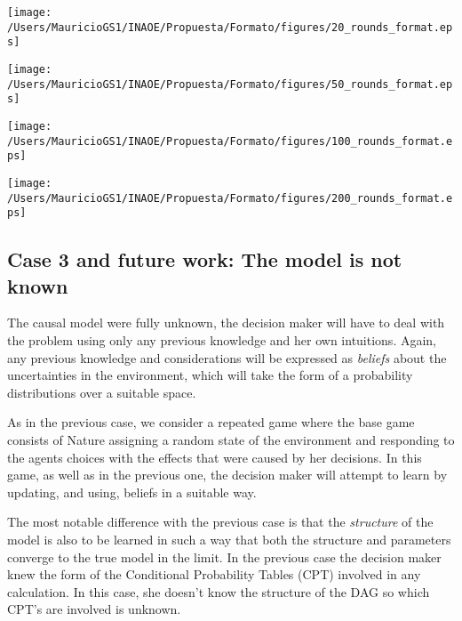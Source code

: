 \documentclass[english,letterpaper,12pt,final]{article}
\theoremstyle{definition}
\begin{document}
\begin{center}
\begin{minipage}{0.48\linewidth}
\texttt{[image: /Users/MauricioGS1/INAOE/Propuesta/Formato/figures/20\_rounds\_format.eps]}
\end{minipage}%
\hfill
\begin{minipage}{0.49\linewidth}
\texttt{[image: /Users/MauricioGS1/INAOE/Propuesta/Formato/figures/50\_rounds\_format.eps]}
\end{minipage}
\end{center}
\begin{center}
\begin{minipage}{0.49\linewidth}
\texttt{[image: /Users/MauricioGS1/INAOE/Propuesta/Formato/figures/100\_rounds\_format.eps]}
\end{minipage}
\hfill
\begin{minipage}{0.49\linewidth}
\texttt{[image: /Users/MauricioGS1/INAOE/Propuesta/Formato/figures/200\_rounds\_format.eps]}
\end{minipage}
\end{center}

\subsection{Case 3 and future work: The model is not known}
The causal model were fully unknown, the decision maker will have to deal with the problem using only any previous knowledge and her own intuitions. Again, any previous knowledge and considerations will be expressed as \textit{beliefs} about the uncertainties in the environment, which will take the form of a probability distributions over a suitable space. 

As in the previous case, we consider a repeated game where the base game consists of Nature assigning a random state of the environment and responding to the agents choices with the effects that were caused by her decisions. In this game, as well as in the previous one, the decision maker will attempt to learn by updating, and using, beliefs in a suitable way. 

The most notable difference with the previous case is that the \textit{structure} of the model is also to be learned in such a way that both the structure and parameters converge to the true model in the limit. In the previous case the decision maker knew the form of the Conditional Probability Tables (CPT) involved in any calculation. In this case, she doesn't know the structure of the DAG so which CPT's are involved is unknown.
\end{document}
